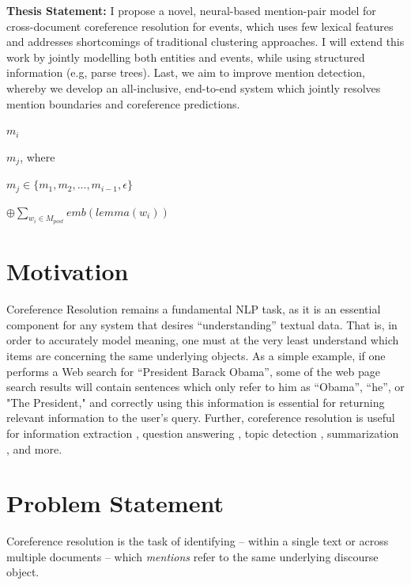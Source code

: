 \textbf{Thesis Statement:} I propose a novel, neural-based mention-pair model for cross-document coreference resolution for events, which uses few lexical features and addresses shortcomings of traditional clustering approaches.  I will extend this work by jointly modelling both entities and events, while using structured information (e.g, parse trees).  Last, we aim to improve mention detection, whereby we develop an all-inclusive, end-to-end system which jointly resolves mention boundaries and coreference predictions.

\vspace{10mm}

$m_{i}$  

$m_{j}$, where 

$m_{j} \in \{m_{1}, m_{2}, ..., m_{i-1}, \epsilon\}$ 


$\oplus \sum\limits_{w_{i}\in M_{post}} emb(lemma(w_{i}))$





\section{Motivation}
Coreference Resolution remains a fundamental NLP task, as it is an essential component for any system that desires ``understanding'' textual data.  That is, in order to accurately model meaning, one must at the very least understand which items are concerning the same underlying objects.  As a simple example, if one performs a Web search for ``President Barack Obama'', some of the web page search results will contain sentences which only refer to him as ``Obama'', ``he'', or "The President," and correctly using this information is essential for returning relevant information to the user's query.  Further, coreference resolution is useful for information extraction \cite{Humphreys:1997:ECI:1598819.1598830}, question answering \cite{Narayanan:2004:QAB:1220355.1220455}, topic detection \cite{Allan:1998}, summarization \cite{Daniel:2003}, and more.

\section{Problem Statement}
Coreference resolution is the task of identifying -- within a single text or across multiple documents -- which \textit{mentions} refer to the same underlying discourse object. 


